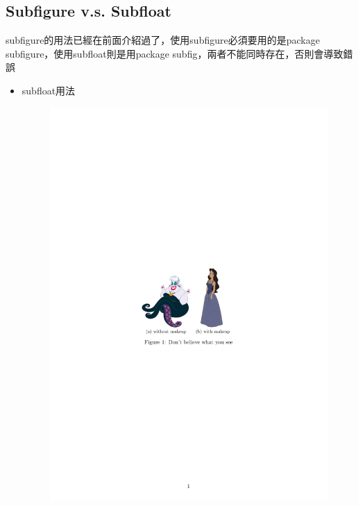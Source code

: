 \documentclass[12pt,a4paper]{report}
\begin{document}
\begin{CJK}{UTF8}{bkai}
\section{Subfigure v.s. Subfloat}
\noindent subfigure的用法已經在前面介紹過了，使用subfigure必須要用的是package subfigure，使用subfloat則是用package subfig，兩者不能同時存在，否則會導致錯誤
\begin{itemize}
\item subfloat用法
\begin{figure}[!h] 
\begin{minipage}[b]{0.5\textwidth} 
\centering 
\includegraphics{./pics/subfloat_example.pdf} 
\end{minipage}%
\begin{minipage}[b]{0.5\textwidth} 
\begin{footnotesize}
\begin{quote}
\begin{verbatim}

\end{verbatim}
\end{quote}
\end{footnotesize}
\end{minipage}
\end{figure}
\end{itemize}
\end{CJK}
\end{document}
